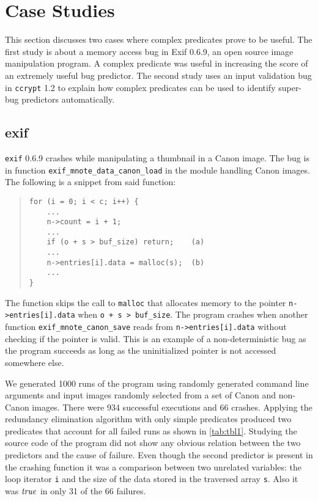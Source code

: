 
\section{Case Studies}
\label{sec-qual}
This section discusses two cases where complex predicates prove to be useful.  The first study is about a memory access bug in Exif 0.6.9, an open source image manipulation program.  A complex predicate was useful in increasing the score of an extremely useful bug predictor.  The second study uses an input validation bug in \texttt{ccrypt} 1.2 to explain how complex predicates can be used to identify super-bug predictors automatically.

\subsection{exif}
\texttt{exif} 0.6.9 crashes while manipulating a thumbnail in a Canon image.  The bug is in function \texttt{exif\_mnote\_data\_canon\_load} in the module handling Canon images.  The following is a snippet from said function:
\begin{quote}
\begin{verbatim}
for (i = 0; i < c; i++) {
    ...
    n->count = i + 1;
    ...
    if (o + s > buf_size) return;    (a)
    ...
    n->entries[i].data = malloc(s);  (b)
    ...
}
\end{verbatim}
\end{quote}

The function skips the call to \texttt{malloc} that allocates memory to the pointer \texttt{n->entries[i].data} when \texttt{o + s > buf\_size}.  The program crashes when another function \texttt{exif\_mnote\_canon\_save} reads from \texttt{n->entries[i].data} without checking if the pointer is valid.  This is an example of a non-deterministic bug as the program succeeds as long as the uninitialized pointer is not accessed somewhere else.

We generated 1000 runs of the program using randomly generated command line arguments and input images randomly selected from a set of Canon and non-Canon images.  There were 934 successful executions and 66 crashes.  Applying the redundancy elimination algorithm with only simple predicates produced two predicates that account for all failed runs as shown in \autoref{tab:tbl1}.  Studying the source code of the program did not show any obvious relation between the two predictors and the cause of failure.  Even though the second predictor is present in the crashing function it was a comparison between two unrelated variables: the loop iterator \texttt{i} and the size of the data stored in the traversed array \texttt{s}.  Also it was $\mathit{true}$ in only 31 of the 66 failures.

